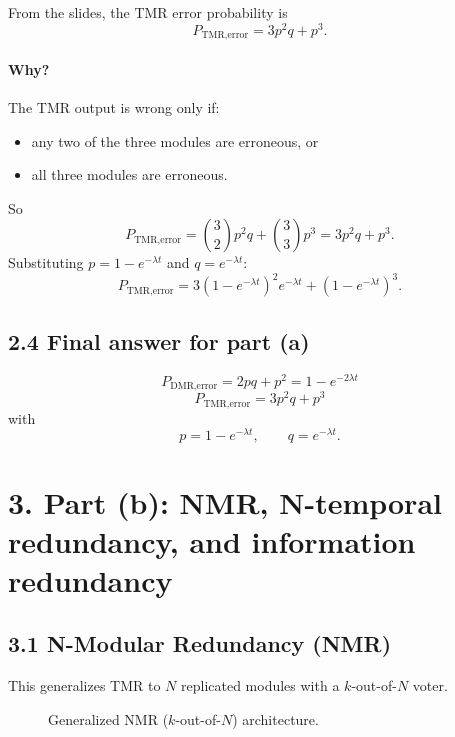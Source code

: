 \documentclass[11pt,a4paper]{article}
\begin{document}
From the slides, the TMR error probability is
\[
P_{\text{TMR,error}} = 3p^2q + p^3.
\]

\paragraph{Why?}
The TMR output is wrong only if:
\begin{itemize}
  \item any two of the three modules are erroneous, or
  \item all three modules are erroneous.
\end{itemize}

So
\[
P_{\text{TMR,error}}
= \binom{3}{2}p^2q + \binom{3}{3}p^3
= 3p^2q + p^3.
\]
Substituting $p=1-e^{-\lambda t}$ and $q=e^{-\lambda t}$:
\[
\boxed{
P_{\text{TMR,error}}
=3(1-e^{-\lambda t})^2e^{-\lambda t} + (1-e^{-\lambda t})^3.
}
\]

\subsection*{2.4 Final answer for part (a)}
\[
\boxed{
P_{\text{DMR,error}}=2pq+p^2=1-e^{-2\lambda t}
}
\]
\[
\boxed{
P_{\text{TMR,error}}=3p^2q+p^3
}
\]
with
\[
p=1-e^{-\lambda t},\qquad q=e^{-\lambda t}.
\]

\section*{3. Part (b): NMR, N-temporal redundancy, and information redundancy}
\subsection*{3.1 N-Modular Redundancy (NMR)}
This generalizes TMR to $N$ replicated modules with a $k$-out-of-$N$ voter.

\begin{figure}[h!]
\centering
{}
\caption{Generalized NMR ($k$-out-of-$N$) architecture.}
\end{figure}
\end{document}
